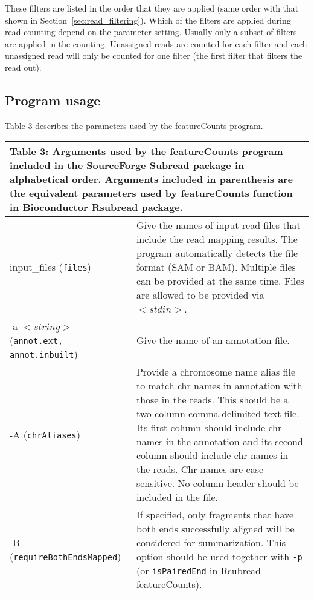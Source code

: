 \documentclass[12pt]{report}
\newcommand{\code}[1]{{\small\texttt{#1}}}
\newcommand{\Subread}{\textsf{Subread}}
\newcommand{\Rsubread}{\textsf{Rsubread}}
\newcommand{\featureCounts}{\textsf{featureCounts}}
\begin{document}
These filters are listed in the order that they are applied (same order with that shown in Section~\ref{sec:read_filtering}).
Which of the filters are applied during read counting depend on the parameter setting.
Usually only a subset of filters are applied in the counting.
Unassigned reads are counted for each filter and each unassigned read will only be counted for one filter (the first filter that filters the read out).


\subsection{Program usage}

Table 3 describes the parameters used by the {\featureCounts} program.

\pagebreak

\begin{longtable}{|p{5cm}|p{11cm}|}
\multicolumn{2}{p{16cm}}{Table 3: Arguments used by the {\featureCounts} program included in the SourceForge {\Subread} package in alphabetical order.
Arguments included in parenthesis are the equivalent parameters used by {\featureCounts} function in Bioconductor {\Rsubread} package.}
\endfirsthead
\hline
Arguments & Description \\
\hline
input\_files \newline (\code{files}) & Give the names of input read files that include the read mapping results. The program automatically detects the file format (SAM or BAM). Multiple files can be provided at the same time. Files are allowed to be provided via $<stdin>$. \\
\hline
-a $<string>$ \newline (\code{annot.ext, annot.inbuilt})  & Give the name of an annotation file. \\
\hline
-A \newline (\code{chrAliases}) & Provide a chromosome name alias file to match chr names in annotation with those in the reads. This should be a two-column comma-delimited text file. Its first column should include chr names in the annotation and its second column should include chr names in the reads. Chr names are case sensitive. No column header should be included in the file.\\
\hline
-B \newline (\code{requireBothEndsMapped}) & If specified, only fragments that have both ends successfully aligned will be considered for summarization. This option should be used together with \code{-p} (or \code{isPairedEnd} in {\Rsubread} {\featureCounts}).\\

\end{longtable}
\end{document}
